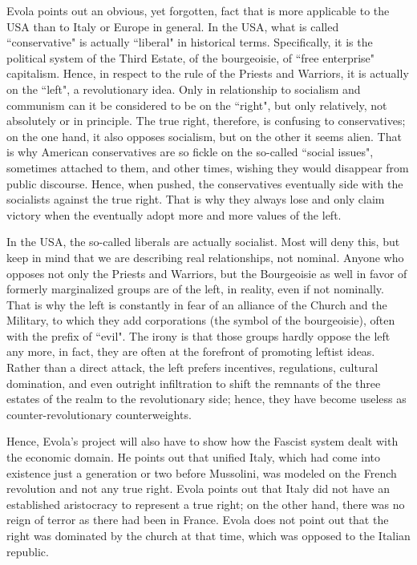 \hfill

Evola points out an obvious, yet forgotten, fact that is more applicable to the USA than to Italy or Europe in general. In the USA, what is called ``conservative" is actually ``liberal" in historical terms. Specifically, it is the political system of the Third Estate, of the bourgeoisie, of ``free enterprise" capitalism. Hence, in respect to the rule of the Priests and Warriors, it is actually on the ``left", a revolutionary idea. Only in relationship to socialism and communism can it be considered to be on the ``right", but only relatively, not absolutely or in principle. The true right, therefore, is confusing to conservatives; on the one hand, it also opposes socialism, but on the other it seems alien. That is why American conservatives are so fickle on the so-called ``social issues", sometimes attached to them, and other times, wishing they would disappear from public discourse. Hence, when pushed, the conservatives eventually side with the socialists against the true right. That is why they always lose and only claim victory when the eventually adopt more and more values of the left.

In the USA, the so-called liberals are actually socialist. Most will deny this, but keep in mind that we are describing real relationships, not nominal. Anyone who opposes not only the Priests and Warriors, but the Bourgeoisie as well in favor of formerly marginalized groups are of the left, in reality, even if not nominally. That is why the left is constantly in fear of an alliance of the Church and the Military, to which they add corporations (the symbol of the bourgeoisie), often with the prefix of ``evil". The irony is that those groups hardly oppose the left any more, in fact, they are often at the forefront of promoting leftist ideas. Rather than a direct attack, the left prefers incentives, regulations, cultural domination, and even outright infiltration to shift the remnants of the three estates of the realm to the revolutionary side; hence, they have become useless as counter-revolutionary counterweights.

Hence, Evola's project will also have to show how the Fascist system dealt with the economic domain. He points out that unified Italy, which had come into existence just a generation or two before Mussolini, was modeled on the French revolution and not any true right. Evola points out that Italy did not have an established aristocracy to represent a true right; on the other hand, there was no reign of terror as there had been in France. Evola does not point out that the right was dominated by the church at that time, which was opposed to the Italian republic.


